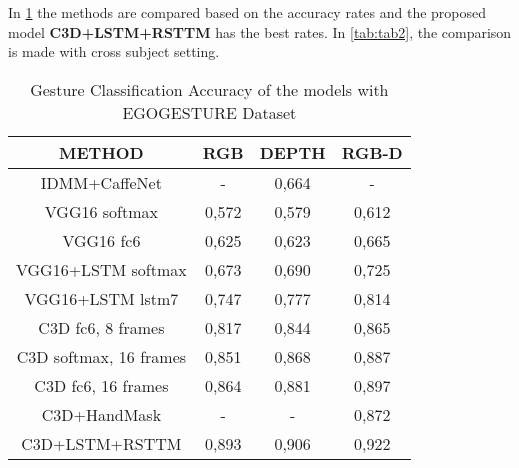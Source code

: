 \documentclass[12pt]{book}
\begin{document}
In \ref{tab:tab1} the methods are compared based on the accuracy rates and the proposed model \textbf{C3D+LSTM+RSTTM} has the best rates. In \ref{tab:tab2}, the comparison is made with cross subject setting.

\begin{table}[!htbp]
\centering
\begin{tabular}{|c|c|c|c|}
\hline
\textbf{METHOD}        & \textbf{RGB} & \textbf{DEPTH} & \textbf{RGB-D} \\
\hline
IDMM+CaffeNet          & -            & 0,664          & -              \\
\hline
VGG16 softmax          & 0,572        & 0,579          & 0,612          \\
\hline
VGG16 fc6              & 0,625        & 0,623          & 0,665          \\
\hline
VGG16+LSTM softmax     & 0,673        & 0,690          & 0,725          \\
\hline
VGG16+LSTM lstm7       & 0,747        & 0,777          & 0,814          \\
\hline
C3D fc6, 8 frames      & 0,817        & 0,844          & 0,865          \\
\hline
C3D softmax, 16 frames & 0,851        & 0,868          & 0,887          \\
\hline
C3D fc6, 16 frames     & 0,864        & 0,881          & 0,897          \\
\hline
C3D+HandMask           & -            & -              & 0,872          \\
\hline
C3D+LSTM+RSTTM         & 0,893        & 0,906          & 0,922          \\
\hline
\end{tabular}
\caption{Gesture Classification Accuracy of the models with EGOGESTURE Dataset \cite{EGO2018}}
\label{tab:tab1}
\end{table}
\end{document}
